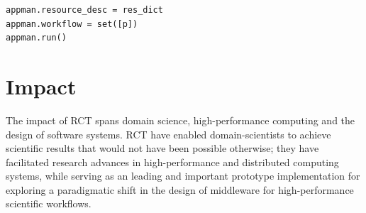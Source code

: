 \documentclass[preprint,12pt, a4paper]{elsarticle}
\begin{document}
\begin{lstlisting}
appman.resource_desc = res_dict
appman.workflow = set([p])
appman.run()
\end{lstlisting}


\section{Impact}\label{sec:impact}



The impact of RCT spans domain science, high-performance computing and the
design of software systems. RCT have enabled domain-scientists to achieve
scientific results that would not have been possible otherwise; they have
facilitated research advances in high-performance and distributed computing
systems, while serving as an leading and important prototype implementation
for exploring a paradigmatic shift in the design of middleware for
high-performance scientific workflows.
\end{document}
